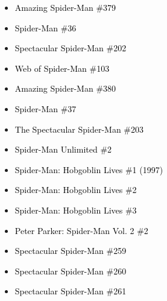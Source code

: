 \documentclass[12pt]{article}
\newcommand{\checkbox}{\raisebox{0.0ex}{\fbox{\rule{0ex}{1.5ex} \rule{1.5ex}{0ex}}}}
\begin{document}
\begin{center}
\begin{tcolorbox}[colback=white!95!gray, colframe=black, width=0.9\textwidth, arc=4mm, auto outer arc, boxrule=0.8pt]
\begin{itemize}[left=0pt,label={\checkbox}]
    \item \textcolor{black}{Amazing Spider-Man \#379}
    \item \textcolor{black}{Spider-Man \#36}
    \item \textcolor{black}{Spectacular Spider-Man \#202}
    \item \textcolor{black}{Web of Spider-Man \#103}
    \item \textcolor{black}{Amazing Spider-Man \#380}
    \item \textcolor{black}{Spider-Man \#37}
    \item \textcolor{black}{The Spectacular Spider-Man \#203}
    \item \textcolor{black}{Spider-Man Unlimited \#2}
    \item \textcolor{black}{Spider-Man: Hobgoblin Lives \#1 (1997)}
    \item \textcolor{black}{Spider-Man: Hobgoblin Lives \#2}
    \item \textcolor{black}{Spider-Man: Hobgoblin Lives \#3}
    \item \textcolor{black}{Peter Parker: Spider-Man Vol. 2 \#2}
    \item \textcolor{black}{Spectacular Spider-Man \#259}
    \item \textcolor{black}{Spectacular Spider-Man \#260}
    \item \textcolor{black}{Spectacular Spider-Man \#261}
\end{itemize}
\end{tcolorbox}
\end{center}
\end{document}
